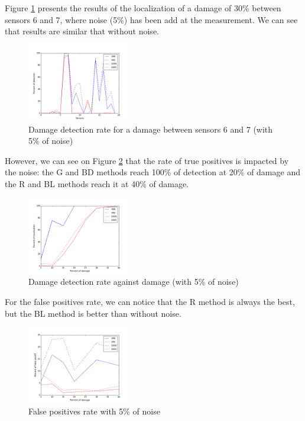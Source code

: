 \documentclass[journal]{IEEEtran}
\begin{document}
Figure \ref{damage30noise} presents the results of the localization of a damage of 30\% between sensors 6 and 7, where noise (5\%) has been add at the measurement. We can see that results are similar that without noise.


\begin{figure}[h!]
  \centering
  \includegraphics[width=0.4\textwidth]{images/damage30percent004noise.png}
  \caption{Damage detection rate for a damage between sensors 6 and 7 (with 5\% of noise)}
  \label{damage30noise}
\end{figure}

However, we can see on Figure \ref{detect_noise} that the rate of true positives is impacted by the noise: the G and BD methods reach 100\% of detection at 20\% of damage and the R and BL methods reach it at 40\% of damage.


\begin{figure}[h!]
  \centering
  \includegraphics[width=0.4\textwidth]{images/detect_noise004.png}
  \caption{Damage detection rate against damage (with 5\% of noise)}
  \label{detect_noise}
\end{figure}

For the false positives rate, we can notice that the R method is always the best, but the BL method is better than without noise.


\begin{figure}[h!]
  \centering
  \includegraphics[width=0.4\textwidth]{images/fp004.png}
  \caption{False positives rate with 5\% of noise}
  \label{fp_noise}
\end{figure}
\end{document}
